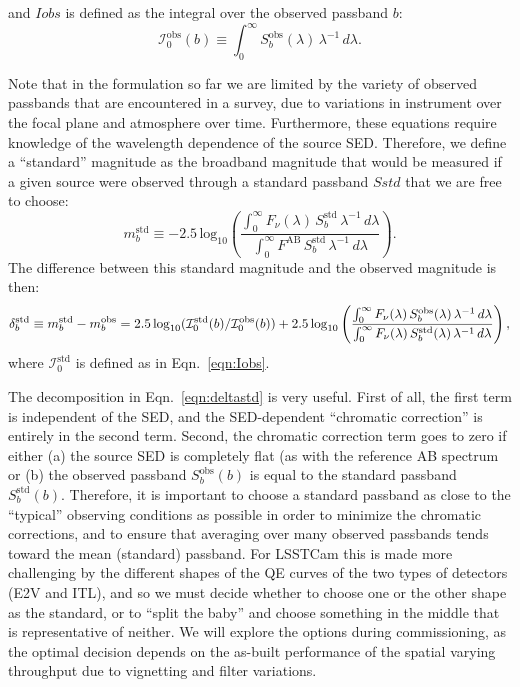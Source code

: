 \documentclass[SE,authoryear,lsstdraft,toc]{lsstdoc}
\newcommand{\mobs}{m_b^{\mathrm{obs}}}
\newcommand{\mstd}{m_b^{\mathrm{std}}}
\newcommand{\Sobs}{S_b^{\mathrm{obs}}}
\newcommand{\Sstd}{S_b^{\mathrm{std}}}
\newcommand{\Iobs}{\mathcal{I}_0^{\mathrm{obs}}}
\newcommand{\Istd}{\mathcal{I}_0^{\mathrm{std}}}
\begin{document}
and $Iobs$ is defined as the integral over the observed passband $b$:
%
\begin{equation}
\label{eqn:Iobs}
\Iobs(b) \equiv \int_0^\infty \Sobs(\lambda)\,\lambda^{-1}\,d\lambda.
\end{equation}
%

Note that in the formulation so far we are limited by the variety of observed
passbands that are encountered in a survey, due to variations in instrument
over the focal plane and atmosphere over time.  Furthermore, these equations
require knowledge of the wavelength dependence of the source SED.  Therefore,
we define a ``standard'' magnitude as the broadband magnitude that would be
measured if a given source were observed through a standard passband $Sstd$
that we are free to choose:
%
\begin{equation}
\mstd \equiv -2.5\,\mathrm{log}_{10} \left ( \frac{\int_0^\infty
  F_\nu(\lambda)\,\Sstd\,\lambda^{-1}\,d\lambda}{\int_0^\infty
  F^{\mathrm{AB}}\,\Sstd\,\lambda^{-1}\,d\lambda} \right ).
\end{equation}
%
The difference between this standard magnitude and the observed magnitude is
then:
%
\begin{equation}
\label{eqn:deltastd}
\delta_b^{\mathrm{std}} \equiv \mstd - \mobs\\
= 2.5\,\mathrm{log}_{10}(\Istd(b)/\Iobs(b))\\
+ 2.5\,\mathrm{log}_{10} \left ( \frac{\int_0^{\infty}
  F_\nu(\lambda)\,\Sobs(\lambda)\,\lambda^{-1}\,d\lambda}{\int_0^{\infty}
  F_\nu(\lambda)\,\Sstd(\lambda)\,\lambda^{-1}\,d\lambda} \right ),
\end{equation}
%
where $\Istd$ is defined as in Eqn.~\ref{eqn:Iobs}.

The decomposition in Eqn.~\ref{eqn:deltastd} is very useful.  First of all, the
first term is independent of the SED, and the SED-dependent ``chromatic
correction'' is entirely in the second term.  Second, the chromatic correction
term goes to zero if either (a) the source SED is completely flat (as with the
reference AB spectrum or (b) the observed passband $\Sobs(b)$ is equal to the
standard passband $\Sstd(b)$.  Therefore, it is important to choose a standard
passband as close to the ``typical'' observing conditions as possible in order
to minimize the chromatic corrections, and to ensure that averaging over many
observed passbands tends toward the mean (standard) passband.  For LSSTCam this
is made more challenging by the different shapes of the QE curves of the two
types of detectors (E2V and ITL), and so we must decide whether to choose one
or the other shape as the standard, or to ``split the baby'' and choose
something in the middle that is representative of neither. We will explore the
options during commissioning, as the optimal decision depends on the as-built
performance of the spatial varying throughput due to vignetting and filter
variations.
\end{document}
